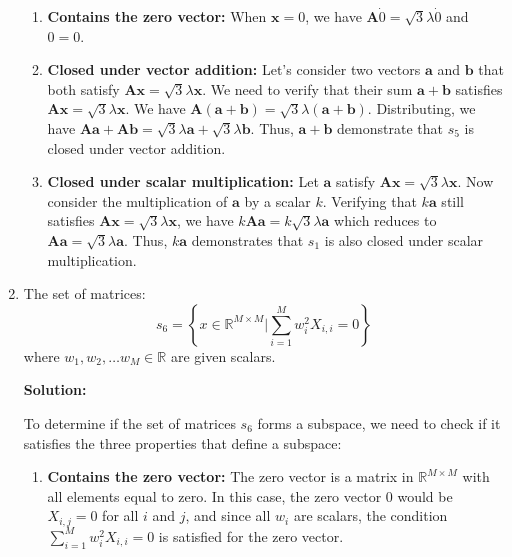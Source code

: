 \begin{enumerate}[label=(\alph*)]
	      \begin{enumerate}[label=\roman*.]
		      \item \textbf{Contains the zero vector:}
		            When $\mathbf{x} = 0$, we have $\mathbf{A} \dot 0 =
			            \sqrt{3}\lambda \dot 0$ and $0 = 0$.
		      \item \textbf{Closed under vector addition:}
		            Let's consider two vectors $\mathbf{a}$ and $\mathbf{b}$ that
		            both satisfy $\mathbf{Ax} = \sqrt{3}\lambda \mathbf{x}$.
		            We need to verify that their sum
		            $\mathbf{a} + \mathbf{b}$ satisfies $\mathbf{Ax} = \sqrt{3}\lambda
			            \mathbf{x}$. We have $\mathbf{A}(\mathbf{a} + \mathbf{b}) =
			            \sqrt{3}\lambda (\mathbf{a} + \mathbf{b})$. Distributing, we have
		            $\mathbf{Aa} + \mathbf{Ab} = \sqrt{3}\lambda \mathbf{a} + \sqrt{3}\lambda
			            \mathbf{b}$.
		            Thus, $\mathbf{a} + \mathbf{b}$ demonstrate that $s_5$ is closed
		            under vector addition.
		      \item \textbf{Closed under scalar multiplication:}
		            Let $\mathbf{a}$ satisfy $\mathbf{Ax} = \sqrt{3}\lambda
			            \mathbf{x}$.
		            Now consider the multiplication of $\mathbf{a}$ by a scalar $k$.
		            Verifying that $k\mathbf{a}$ still satisfies $\mathbf{Ax} = \sqrt{3}\lambda
			            \mathbf{x}$, we have $k\mathbf{Aa} = k\sqrt{3}\lambda
			            \mathbf{a}$ which reduces to $\mathbf{Aa} = \sqrt{3}\lambda
			            \mathbf{a}$. Thus, $k\mathbf{a}$ demonstrates that $s_1$ is also closed under scalar
		            multiplication.

	      \end{enumerate}

	\item The set of matrices:
	      $$s_{6} =
		      \left\{
		      x \in \mathbb{R}^{M \times M} | \sum_{i=1}^{M}w_i^2X_{i,i} =
		      0
		      \right\}$$
	      where $w_1, w_2, \ldots w_M \in \mathbb{R}$ are given scalars.

	      \par \textbf{Solution:}
	      \par To determine if the set of matrices $s_6$ forms a subspace, we need
	      to check if it satisfies the three properties that define a subspace:

	      \begin{enumerate}[label=\roman*.]
		      \item \textbf{Contains the zero vector:} The zero vector is a matrix in $\mathbb{R}^{M \times M}$
		            with all elements equal to zero. In this case, the zero vector $0$ would
		            be $X_{i,j} = 0$ for all $i$ and $j$, and since all $w_i$ are scalars,
		            the condition $\sum_{i=1}^{M}w_i^2X_{i,i} = 0$ is satisfied for the zero
		            vector.


\end{enumerate}
\end{enumerate}
